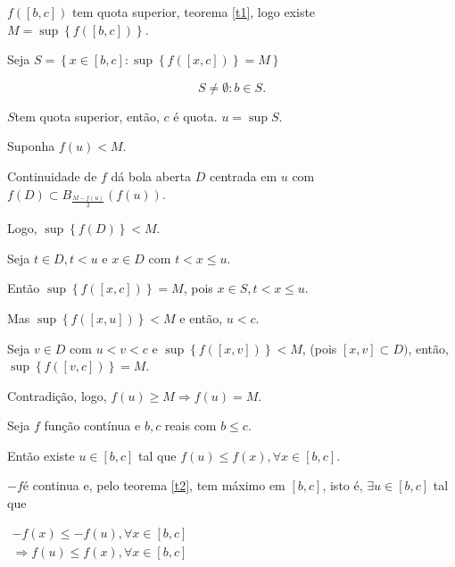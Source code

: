 \documentclass[11pt, oneside, a4paper]{gsm-l}
\begin{document}
\begin{dem}

$f\left( {\left[ {b,c} \right]} \right)$ tem quota superior, teorema \ref{t1},
logo existe $M = \sup \left\{ {f\left( {\left[ {b,c} \right]} \right)}
\right\}$.

Seja $S = \left\{ {x \in \left[ {b,c} \right]:\sup \left\{ {f\left( {\left[
{x,c} \right]} \right)} \right\} = M} \right\}$

\[
S \ne \emptyset :b \in S.
\]

$S$tem quota superior, então, $c$ é quota. $u = \sup S$.

Suponha $f\left( u \right) < M$.

Continuidade de $f$ dá bola aberta $D$ centrada em $u$ com $f\left( D
\right) \subset B_{\frac{M - f\left( u \right)}{2}} \left( {f\left( u
\right)} \right)$.

Logo, $\sup \left\{ {f\left( D \right)} \right\} < M$.

Seja $t \in D,t < u$ e $x \in D$ com $t < x \leqslant u$.

Então $\sup \left\{ {f\left( {\left[ {x,c} \right]} \right)} \right\} =
M$, pois $x \in S,t < x \leqslant u$.

Mas $\sup \left\{ {f\left( {\left[ {x,u} \right]} \right)} \right\} < M$ e
então, $u < c$.

Seja $v \in D$ com $u < v < c$ e $\sup \left\{ {f\left( {\left[ {x,v}
\right]} \right)} \right\} < M$, (pois $\left[ {x,v} \right] \subset D)$,
então, $\sup \left\{ {f\left( {\left[ {v,c} \right]} \right)} \right\} =
M$.

Contradição, logo, $f\left( u \right) \geqslant M \Rightarrow
f\left( u \right) = M$.

\end{dem}

\begin{teo}

Seja $f$ função contínua e $b,c$ reais com $b \leqslant c$.

Então existe $u \in \left[ {b,c} \right]$ tal que $f\left( u \right)
\leqslant f\left( x \right),\forall x \in \left[ {b,c} \right]$.

\end{teo}

\begin{dem}

$ - f$é continua e, pelo teorema \ref{t2}, tem máximo em $\left[ {b,c}
\right]$, isto é, $\exists u \in \left[ {b,c} \right]$ tal que

$\begin{array}{l}
- f\left( x \right) \leqslant - f\left( u \right),\forall x \in \left[
{b,c} \right] \\
\Rightarrow f\left( u \right) \leqslant f\left( x \right),\forall x \in
\left[ {b,c} \right] \\
\end{array}$

\end{dem}
\end{document}
